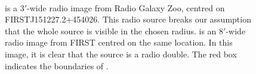 \documentclass[fleqn,usenatbib,usedcolumn]{mnras}
\begin{document}
    \begin{figure}
      \centering
      \\
      \caption{\protect{} is a $3'$-wide radio image from Radio Galaxy
        Zoo, centred on FIRSTJ151227.2+454026. This radio source
        breaks our assumption that the whole source is visible in the chosen
        radius. \protect{} is an $8'$-wide radio image from FIRST centred
        on the same location. In this image, it is clear that the source is a
        radio double. The red box indicates the boundaries of \protect{}.}
      \label{fig:broken-contains}
    \end{figure}
\end{document}
